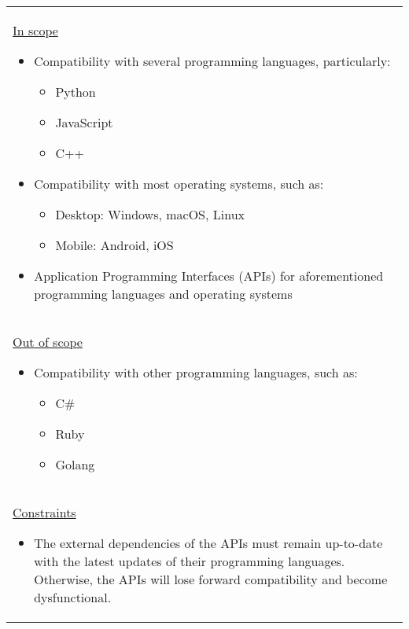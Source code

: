 \begin{longtable}{ | p{} l | }
    \multicolumn{2}{|p{\textwidth}|}{\hspace{0.6cm}\underline{In scope}
        \begin{itemize}
            \item Compatibility with several programming languages, particularly:
                \begin{itemize}
                    \item Python
                    \item JavaScript
                    \item C++
                \end{itemize}
            \item Compatibility with most operating systems, such as:
                \begin{itemize}
                    \item Desktop: Windows, macOS, Linux
                    \item Mobile: Android, iOS
                \end{itemize}
            \item Application Programming Interfaces (APIs) for aforementioned programming languages and operating systems
        \end{itemize}
    } \\
    \multicolumn{2}{|p{\textwidth}|}{\hspace{0.6cm}\underline{Out of scope}
        \begin{itemize}
            \item Compatibility with other programming languages, such as:
                \begin{itemize}
                    \item C\#
                    \item Ruby
                    \item Golang
                \end{itemize}
        \end{itemize}
    } \\
    \multicolumn{2}{|p{\textwidth}|}{\hspace{0.6cm}\underline{Constraints}
        \begin{itemize}
            \item The external dependencies of the APIs must remain up-to-date with the latest updates of their programming languages. Otherwise, the APIs will lose forward compatibility and become dysfunctional.
        \end{itemize}
}
\end{longtable}
